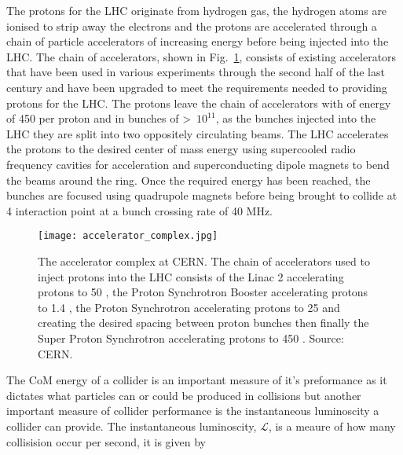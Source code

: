 The protons for the LHC originate from hydrogen gas, %
the hydrogen atoms are ionised to strip away the electrons and the protons are accelerated through a chain of particle accelerators of increasing energy before being injected into the LHC. The chain of accelerators, shown in Fig.~\ref{fig:accelerator_chain}, consists of existing accelerators that have been used in various experiments through the second half of the last century and have been upgraded to meet the requirements needed to providing protons for the LHC. 
The protons leave the chain of accelerators with of energy of 450 \gev per proton and in bunches of >~$10^{11}$, as the bunches injected into the LHC they are split into two oppositely circulating beams.
The LHC accelerates the protons to the desired center of mass energy using supercooled radio frequency cavities for acceleration and superconducting dipole magnets to bend the beams around the ring. %
Once the required energy has been reached, the bunches are focused using quadrupole magnets before being brought to collide at 4 interaction point at a bunch crossing rate of 40 MHz. 


\begin{figure}[htbp!] 
  \centering    
  \texttt{[image: accelerator\_complex.jpg]}
  \caption{The accelerator complex at CERN. The chain of accelerators used to inject protons into the LHC consists of the Linac 2 accelerating protons to 50 \mev, the Proton Synchrotron Booster accelerating protons to 1.4 \gev, the Proton Synchrotron accelerating protons to 25 \gev and creating the desired spacing between proton bunches then finally the Super Proton Synchrotron accelerating protons to 450 \gev. Source: CERN.}
  \label{fig:accelerator_chain}
\end{figure}




The CoM energy of a collider is an important measure of it's preformance as it dictates what particles can or could be produced in collisions but another important measure of collider performance is the instantaneous luminoscity a collider can provide. The instantaneous luminoscity, $\mathcal{L}$, is a meaure of how many collisision occur per second, it is given by

